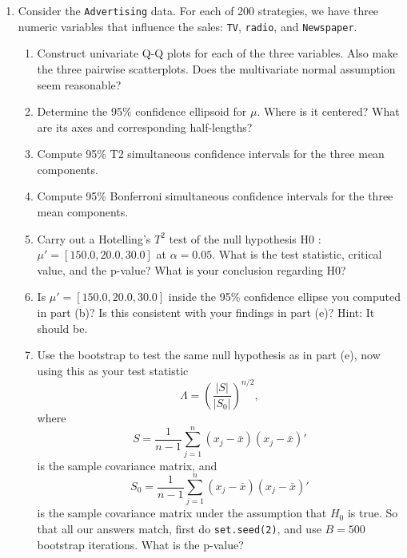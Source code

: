 \documentclass[12pt,a4paper]{paper}
\begin{document}
\begin{enumerate}
(age of the car) and Price (sale price of car, in \$1,000s)
\begin{enumerate}
\item Determine the power transformation $\hat{\lambda}_{1}$ that makes the $x_{1}$ values approximately normal. Construct a Q-Q plot for the transformed data.
\item Determine the power transformation $\hat{\lambda}_{2}$ that makes the $x_{2}$ values approximately normal. Construct a Q-Q plot for the transformed data.
\item Determine the power transformations $\hat{\lambda}' = \left[\hat{\lambda}_{1},\hat{\lambda}_{2}\right]$ that make the $\left[x_{1},x_{2}\right]$ values approximately multivariate normal. Compare the results with those from above.
\end{enumerate}
\item Consider the \texttt{Advertising} data. For each of 200 strategies, we have three numeric variables that influence the sales: \texttt{TV}, \texttt{radio}, and \texttt{Newspaper}.
\begin{enumerate}
\item Construct univariate Q-Q plots for each of the three variables. Also make the three
pairwise scatterplots. Does the multivariate normal assumption seem reasonable?
\item Determine the 95\% confidence ellipsoid for $\mu$. Where is it centered? What are its axes and corresponding half-lengths?
\item Compute 95\% T2 simultaneous confidence intervals for the three mean components.
\item Compute 95\% Bonferroni simultaneous confidence intervals for the three mean components.
\item Carry out a Hotelling's $T^{2}$ test of the null hypothesis H0 : $\mu' = \left[150.0,20.0,30.0\right]$ at $\alpha = 0.05$. What is the test statistic, critical value, and the p-value? What is your conclusion regarding H0?
\item Is $\mu' = [150.0, 20.0, 30.0]$ inside the 95\% confidence ellipse you computed in part (b)? Is this consistent with your findings in part (e)? Hint: It should be.
\item Use the bootstrap to test the same null hypothesis as in part (e), now using this as your test statistic
\[\Lambda = \left(\frac{\left|S\right|}{\left|S_{0}\right|}\right)^{n/2},\]where \[S = \frac{1}{n-1}\sum_{j=1}^{n}(x_{j}-\bar{x})(x_{j}-\bar{x})'\] is the sample covariance matrix, and \[S_{0} = \frac{1}{n-1}\sum_{j=1}^{n}(x_{j}-\bar{x})(x_{j}-\bar{x})'\] is the sample covariance matrix under the assumption that $H_{0}$ is true. So that all our answers match, first do \texttt{set.seed(2)}, and use $B=500$ bootstrap iterations. What is the p-value?
\end{enumerate}
\end{enumerate}
\end{document}
